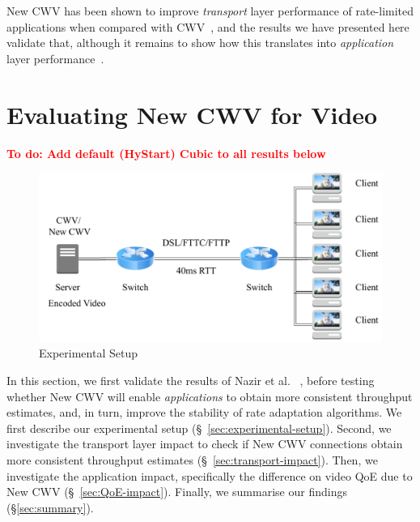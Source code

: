 \documentclass[10pt, acmlarge]{acmart}
\newcommand{\todo}[1]{\textbf{\textcolor{red}{To do: #1}}}
\begin{document}
New CWV has been shown to improve \emph{transport} layer performance of rate-limited 
applications when compared with 
CWV~\cite{Nazir-2014-performance-evaluation-congestion-window-validation-dash-newcwv}, 
and the results we have presented here validate that, although it remains to show how 
this translates into \emph{application} layer performance~\cite{Spiteri-2016-BOLA}. 

\section{Evaluating New CWV for Video}
\label{sec:evaluation}

\todo{Add default (HyStart) Cubic to all results below}

\begin{figure}
  \centering
  \includegraphics[width=\textwidth, keepaspectratio]{figures/setup.pdf}
  \caption{Experimental Setup}
  \label{fig:experimental-setup}
\end{figure}

In this section, we first validate the results of Nazir et al.
~\cite{Nazir-2014-performance-evaluation-congestion-window-validation-dash-newcwv}, 
before testing whether New CWV will enable \emph{applications} to obtain more consistent 
throughput estimates, and, in turn, improve the stability of rate adaptation algorithms.
We first describe our experimental setup (\S~\ref{sec:experimental-setup}). 
Second, we investigate the transport layer impact to check if New CWV connections obtain 
more consistent throughput estimates (\S~\ref{sec:transport-impact}). Then, we investigate 
the application impact, specifically the difference on video QoE due to New CWV 
(\S~\ref{sec:QoE-impact}). Finally, we summarise our findings (\S\ref{sec:summary}).
\end{document}
